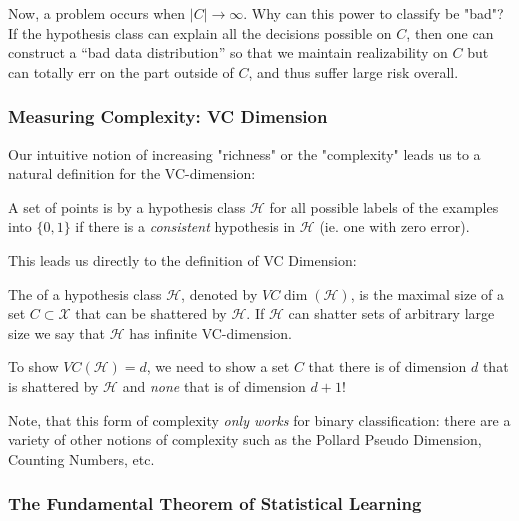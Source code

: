 \documentclass[11pt]{scrartcl}
\begin{document}
Now, a problem occurs when $|C| \to \infty$. Why can this power to classify be "bad"? If the hypothesis class can explain all the decisions possible on $C$, then one can construct a “bad data distribution” so that we maintain realizability on $C$ but can totally err on the part outside of $C$, and thus suffer large risk overall.
 
\subsubsection{Measuring Complexity: VC Dimension}

Our intuitive notion of increasing "richness" or the "complexity" leads us to a natural definition for the VC-dimension:

\begin{defn}
A set of points is  by a hypothesis class $\mathcal{H}$ for all possible labels of the examples into $\{0,1\}$ if there is a \textit{consistent} hypothesis in $\mathcal{H}$ (ie. one with zero error). 
\end{defn}

This leads us directly to the definition of VC Dimension: 

\begin{defn}
The  of a hypothesis class $\mathcal{H}$, denoted by $VC\dim(\mathcal{H})$, is the maximal size of a set $C \subset \mathcal{X}$ that can be shattered by $\mathcal{H}$. If $\mathcal{H}$ can shatter sets of arbitrary large size we say that $\mathcal{H}$ has infinite VC-dimension.
\end{defn}

\begin{remark}
To show $VC(\mathcal{H})=d$, we need to show a set $C$ that there is of dimension $d$ that is shattered by $\mathcal{H}$ and \textit{none} that is of dimension $d+1$!
\end{remark}

Note, that this form of complexity \textit{only works} for binary classification: there are a variety of other notions of complexity such as the Pollard Pseudo Dimension, Counting Numbers, etc.

\subsubsection{The Fundamental Theorem of Statistical Learning}
\end{document}
